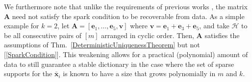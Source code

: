 \documentclass[9pt,twocolumn]{pnas-new}
\renewcommand{\eqref}[1]{\textnormal{[\ref{#1}]}}
\begin{document}




We furthermore note that unlike the requirements of previous works \cite{li2004analysis, Georgiev05, Aharon06, Hillar15}, the matrix $\mathbf{A}$ need not satisfy the spark condition to be recoverable from data. As a simple example for $k=2$, let $\mathbf{A} = [ \mathbf{e}_1, \ldots, \mathbf{e}_5, \mathbf{v}]$ where $\mathbf{v} = \mathbf{e}_1 + \mathbf{e}_3 + \mathbf{e}_5$, and take $\mathcal{H}$ to be all consecutive pairs of $[m]$ arranged in cyclic order. Then, $\mathbf{A}$ satisfies the assumptions of Thm.~\ref{DeterministicUniquenessTheorem} but not \eqref{SparkCondition}. %
This weakening allows for a practical (polynomial) amount of data to still guarantee a stable dictionary in the case where the set of sparse supports for the $\mathbf{\bar x}_i$ is known to have a size that grows polynomially in $m$ and $k$.
\end{document}
